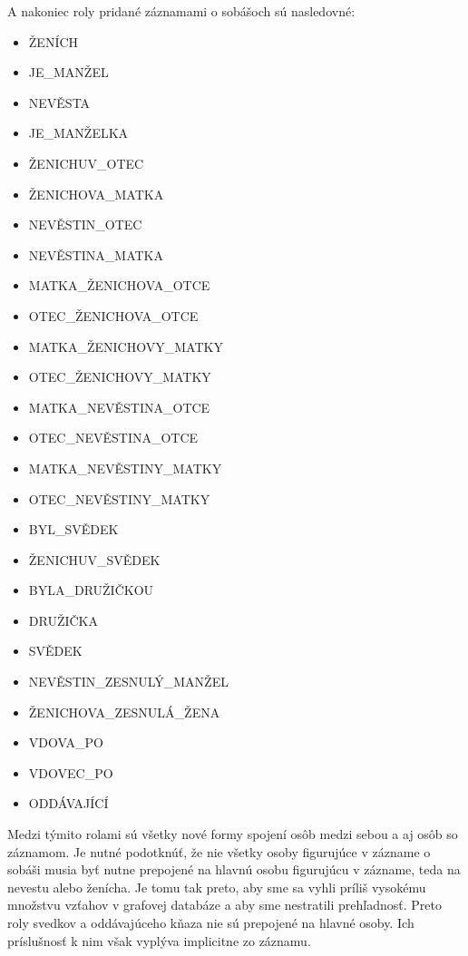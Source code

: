 A nakoniec roly pridané záznamami o sobášoch sú nasledovné:
\begin{multicols}{2}
    \begin{itemize}
        \item ŽENÍCH
        \item JE\_MANŽEL
        \item NEVĚSTA
        \item JE\_MANŽELKA
        \item ŽENICHUV\_OTEC
        \item ŽENICHOVA\_MATKA
        \item NEVĚSTIN\_OTEC
        \item NEVĚSTINA\_MATKA
        \item MATKA\_ŽENICHOVA\_OTCE
        \item OTEC\_ŽENICHOVA\_OTCE
        \item MATKA\_ŽENICHOVY\_MATKY
        \item OTEC\_ŽENICHOVY\_MATKY
        \item MATKA\_NEVĚSTINA\_OTCE
        \item OTEC\_NEVĚSTINA\_OTCE
        \item MATKA\_NEVĚSTINY\_MATKY
        \item OTEC\_NEVĚSTINY\_MATKY
        \item BYL\_SVĚDEK
        \item ŽENICHUV\_SVĚDEK
        \item BYLA\_DRUŽIČKOU
        \item DRUŽIČKA
        \item SVĚDEK
        \item NEVĚSTIN\_ZESNULÝ\_MANŽEL
        \item ŽENICHOVA\_ZESNULÁ\_ŽENA
        \item VDOVA\_PO
        \item VDOVEC\_PO
        \item ODDÁVAJÍCÍ
    \end{itemize}
\end{multicols}

Medzi týmito rolami sú všetky nové formy spojení osôb medzi sebou a aj osôb so záznamom. Je nutné podotknúť, že nie všetky osoby figurujúce v zázname o sobáši  musia byť nutne prepojené na hlavnú osobu figurujúcu v zázname, teda na nevestu alebo ženícha. Je tomu tak preto, aby sme sa vyhli príliš vysokému množstvu vzťahov v grafovej databáze a aby sme nestratili prehľadnosť. Preto roly svedkov a oddávajúceho kňaza nie sú prepojené na hlavné osoby. Ich príslušnosť k nim však vyplýva implicitne zo záznamu.

